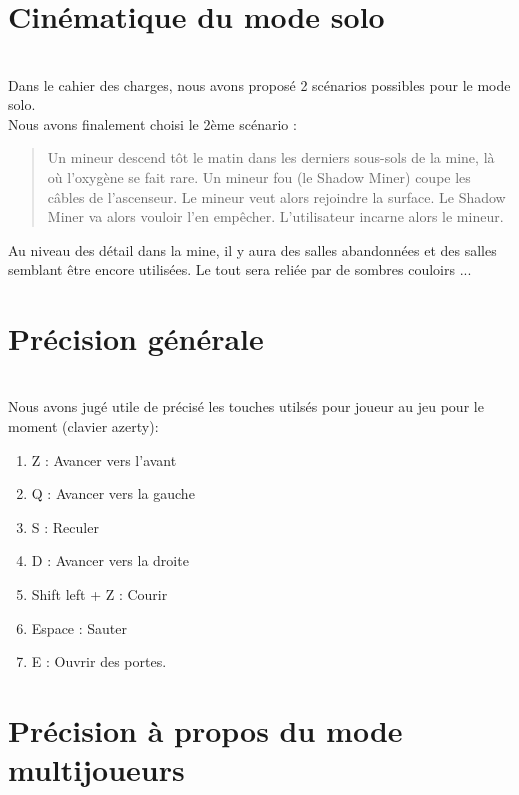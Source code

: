 \documentclass[titlepage, 13px, a4paper]{article}
\begin{document}
\section{Cinématique du mode solo}
\paragraph{} \hspace{0pt} \\
Dans le cahier des charges, nous avons proposé 2 scénarios possibles pour le mode solo. \\
Nous avons finalement choisi le 2ème scénario : 
\\
\begin{quotation}
	Un mineur descend tôt le matin dans les derniers sous-sols de la mine, là où l’oxygène se fait rare. 
	Un mineur fou (le Shadow Miner) coupe les câbles de l’ascenseur. 
	Le mineur veut alors rejoindre la surface. Le Shadow Miner va alors vouloir l’en empêcher.
	L’utilisateur incarne alors le mineur. \\
\end{quotation}

Au niveau des détail dans la mine, il y aura des salles abandonnées et des salles semblant être encore utilisées.
Le tout sera reliée par de sombres couloirs ...

\section{Précision générale}
\paragraph{} \hspace{0pt} \\
Nous avons jugé utile de précisé les touches utilsés pour joueur au jeu pour le moment (clavier azerty): 
{\begin{enumerate}
	\item Z : Avancer vers l'avant
	\item Q : Avancer vers la gauche
	\item S : Reculer
	\item D : Avancer vers la droite
	\item Shift left + Z : Courir
	\item Espace : Sauter
	\item E : Ouvrir des portes.
\end{enumerate}}

\section{Précision à propos du mode multijoueurs}
\end{document}
